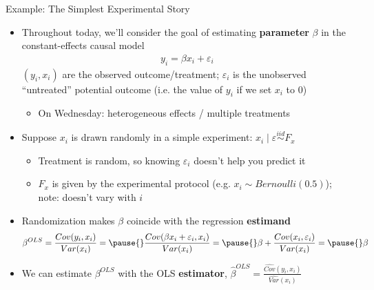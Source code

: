 \documentclass[11pt,english]{beamer}
\begin{document}
\begin{frame}{Example: The Simplest Experimental Story}
\vspace{0.1cm}
\begin{itemize}
\item Throughout today, we'll consider the goal of estimating \textbf{parameter} $\beta$ in the constant-effects causal model
\begin{align*}
y_i = \beta x_i + \varepsilon_i
\end{align*}
$(y_i,x_i)$ are the observed outcome/treatment; $\varepsilon_i$ is the unobserved ``untreated'' potential outcome (i.e. the value of $y_i$ if we set $x_i$ to $0$)\smallskip\pause{}
\begin{itemize}
\item On Wednesday: heterogeneous effects / multiple treatments
\end{itemize}\smallskip\pause{}
\item Suppose $x_i$ is drawn randomly in a simple experiment: $x_i\mid \varepsilon \stackrel{iid}{\sim} F_x$\smallskip\pause{}
\begin{itemize}
\item Treatment is random, so knowing $\varepsilon_i$ doesn't help you predict it\smallskip\pause{}
\item $F_x$ is given by the experimental protocol (e.g. $x_i\sim Bernoulli(0.5)$); \\ note: doesn't vary with $i$
\medskip\pause{}
\end{itemize}
\item Randomization makes $\beta$ coincide with the regression \textbf{estimand}
\begin{align*}
\beta^{OLS}=\frac{Cov(y_i,x_i)}{Var(x_i)}=\pause{}\frac{Cov(\beta x_i + \varepsilon_i,x_i)}{Var(x_i)}=\pause{}\beta + \frac{Cov(x_i,\varepsilon_i)}{Var(x_i)}=\pause{}\beta
\end{align*}\pause{}
\item We can estimate $\beta^{OLS}$ with the OLS \textbf{estimator}, $\hat\beta^{OLS}=\frac{\widehat{Cov}(y_i,x_i)}{\widehat{Var}(x_i)}$
\end{itemize}
\end{frame}
\end{document}
